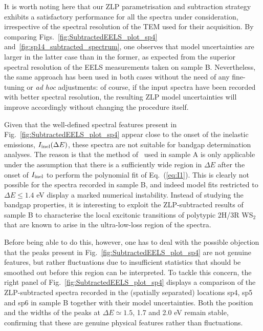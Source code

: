 It is worth noting here that our ZLP parametrisation and subtraction strategy exhibits a satisfactory
performance for all the spectra under consideration, irrespective of the spectral resolution of the TEM used
for their acquisition.
%
By comparing Figs.~\ref{fig:SubtractedEELS_plot_sp4} and~\ref{fig:sp14_subtracted_spectrum}, one observes
that  model uncertainties are larger in the latter case than in the former, as expected from the
superior 
spectral resolution of the EELS measurements taken on sample B.
%
Nevertheless, the same approach has been used in both cases without the need of any fine-tuning
or {\it ad hoc} adjustments: of course, if the input
spectra have been recorded with better spectral resolution, the resulting ZLP model uncertainties
will improve accordingly without changing the procedure itself.

Given that the
well-defined spectral features present in Fig.~\ref{fig:SubtractedEELS_plot_sp4}
appear close to the onset of the inelastic emissions, $I_{\rm inel}(\Delta E)$,
these spectra are not suitable for bandgap determination analyses.
%
The reason is that the method of~\cite{Rafferty:2000}
used in sample A is only applicable under the assumption that there is a sufficiently wide region in $\Delta E$
after the onset of $I_{\rm inel}$ to perform the polynomial fit of Eq.~(\ref{eq:I1}).
%
This is clearly not possible  for the spectra recorded in sample B, and indeed model fits restricted to $\Delta E\le 1.4$ eV
display a marked numerical instability.
%
Instead of studying the bandgap properties, it is interesting to exploit the ZLP-subtracted results of sample B
to characterise the local
excitonic transitions of polytypic 2H/3R WS$_2$
that are known to arise in the ultra-low-loss region of the spectra.

Before being able to do this, however, one has to deal with the possible objection
that the peaks present in Fig.~\ref{fig:SubtractedEELS_plot_sp4} are not
genuine features, but rather fluctuations due to insufficient statistics
that should be smoothed out before this region can be interpreted.
%
To tackle this concern, the right panel of Fig.~\ref{fig:SubtractedEELS_plot_sp4}
displays a
comparison of the ZLP-subtracted spectra recorded in the (spatially separated) locations sp4, sp5 and sp6
in sample B
together with their model uncertainties.
%
Both the position and the widths of the peaks at $\Delta E\simeq 1.5$,
1.7 and 2.0 eV remain stable, confirming that these
are genuine physical features rather than fluctuations.

